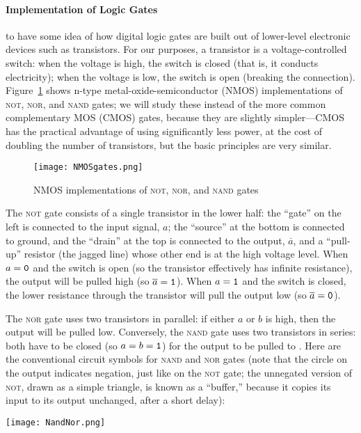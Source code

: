 \paragraph{Implementation of Logic Gates}

 to have some idea of how digital logic gates are built out of lower-level electronic devices such as transistors. For our purposes, a transistor is a voltage-controlled switch: when the voltage is high, the switch is closed (that is, it conducts electricity); when the voltage is low, the switch is open (breaking the connection). Figure~\ref{fig:nmosgates} shows n-type metal-oxide-semiconductor (NMOS) implementations of \textsc{not}, \textsc{nor}, and \textsc{nand} gates; we will study these instead of the more common complementary MOS (CMOS) gates, because they are slightly simpler---CMOS has the practical advantage of using significantly less power, at the cost of doubling the number of transistors, but the basic principles are very similar.

\begin{figure}
\begin{center}
\texttt{[image: NMOSgates.png]}
\end{center}
\caption{NMOS implementations of \textsc{not}, \textsc{nor}, and \textsc{nand} gates}
\label{fig:nmosgates}
\end{figure}

The \textsc{not} gate consists of a single transistor in the lower half: the ``gate'' on the left is connected to the input signal, $a$; the ``source'' at the bottom is connected to ground, and the ``drain'' at the top is connected to the output, $\overline{a}$, and a ``pull-up'' resistor (the jagged line) whose other end is at the high voltage level. When $a=\mathtt{0}$ and the switch is open (so the transistor effectively has infinite resistance), the output will be pulled high (so $\overline{a}=\mathtt{1}$). When $a=\mathtt{1}$ and the switch is closed, the lower resistance through the transistor will pull the output low (so $\overline{a}=\mathtt{0}$).

The \textsc{nor} gate uses two transistors in parallel: if either $a$ or $b$ is high, then the output will be pulled low. Conversely, the \textsc{nand} gate uses two transistors in series: both have to be closed (so $a=b=\mathtt{1}$) for the output to be pulled to \0. Here are the conventional circuit symbols for \textsc{nand} and \textsc{nor} gates (note that the circle on the output indicates negation, just like on the \textsc{not} gate; the unnegated version of \textsc{not}, drawn as a simple triangle, is known as a ``buffer,'' because it copies its input to its output unchanged, after a short delay):
\begin{center}
\texttt{[image: NandNor.png]}
\end{center}

